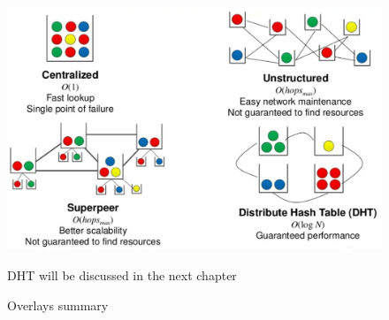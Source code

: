 \begin{figure}[htbp]
   \centering
   \includegraphics{images/overlays_summary.png}
   \caption{Overlays summary}
   \label{fig:overlays_summary}
   DHT will be discussed in the next chapter
\end{figure}